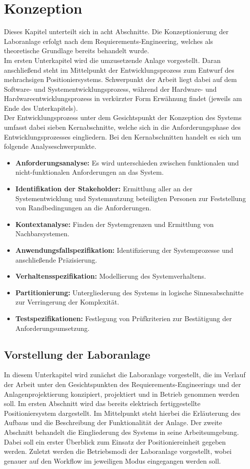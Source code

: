 \documentclass[../Bachelorarbeit.tex]{subfiles}
\begin{document}
\section{Konzeption}
Dieses Kapitel unterteilt sich in acht Abschnitte. Die Konzeptionierung der Laboranlage erfolgt nach dem Requierements-Engineering, welches als theoretische Grundlage bereits behandelt wurde.\\
Im ersten Unterkapitel wird die umzusetzende Anlage vorgestellt. Daran anschließend steht im Mittelpunkt der Entwicklungsprozess zum Entwurf des mehrachsigen Positioniersystems. Schwerpunkt der Arbeit liegt dabei auf dem Software- und Systementwicklungsprozess, während der Hardware- und Hardwareentwicklungsprozess in verkürzter Form Erwähnung findet (jeweils am Ende des Unterkapitels).\\
Der Entwicklungsprozess unter dem Gesichtspunkt der Konzeption des Systems umfasst dabei sieben Kernabschnitte, welche sich in die Anforderungsphase des Entwicklungsprozesses eingliedern. Bei den Kernabschnitten handelt es sich um folgende Analyseschwerpunkte.\\
\begin{itemize}
    \item \textbf{Anforderungsanalyse:} Es wird unterschieden zwischen funktionalen und nicht-funktionalen Anforderungen an das System.
    \item \textbf{Identifikation der Stakeholder:} Ermittlung aller an der Systementwicklung und Systemnutzung beteiligten Personen zur Feststellung von Randbedingungen an die Anforderungen.
    \item \textbf{Kontextanalyse:} Finden der Systemgrenzen und Ermittlung von Nachbarsystemen.
    \item \textbf{Anwendungsfallspezifikation:} Identifizierung der Systemprozesse und anschließende Präzisierung.
    \item \textbf{Verhaltensspezifikation:} Modellierung des Systemverhaltens.
    \item \textbf{Partitionierung:} Untergliederung des Systems in logische Sinnesabschnitte zur Verringerung der Komplexität.
    \item \textbf{Testspezifikationen:} Festlegung von Prüfkriterien zur Bestätigung der Anforderungsumsetzung.
\end{itemize}
\subsection{Vorstellung der Laboranlage}
In diesem Unterkapitel wird zunächst die Laboranlage vorgestellt, die im Verlauf der Arbeit unter den Gesichtspunkten des Requierements-Engineerings und der Anlagenprojektierung konzipiert, projektiert und in Betrieb genommen werden soll. Im ersten Abschnitt wird das bereits elektrisch fertiggestellte Positioniersystem dargestellt. Im Mittelpunkt steht hierbei die Erläuterung des Aufbaus und die Beschreibung der Funktionalität der Anlage. Der zweite Abschnitt behandelt die Eingliederung des Systems in seine Arbeitsumgebung. Dabei soll ein erster Überblick zum Einsatz der Positioniereinheit gegeben werden. Zuletzt werden die Betriebsmodi der Laboranlage vorgestellt, wobei genauer auf den Workflow im jeweiligen Modus eingegangen werden soll.
\end{document}
